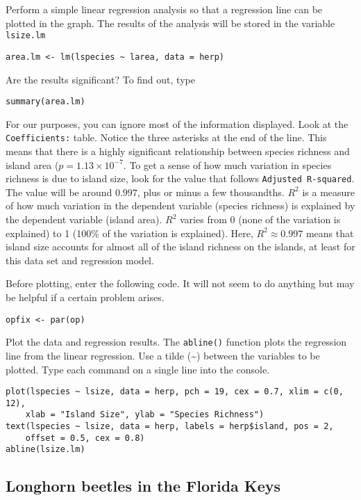 \documentclass[11pt]{article}
\begin{document}
Perform a simple linear regression analysis so that a regression line can be plotted in the graph. The results of the analysis will be stored in the variable \texttt{lsize.lm}

\begin{verbatim}
area.lm <- lm(lspecies ~ larea, data = herp)
\end{verbatim}

Are the results significant?  To find out, type

\begin{verbatim}
summary(area.lm)
\end{verbatim}

For our purposes, you can ignore most of the information displayed.  Look at the \texttt{Coefficients:} table. Notice the three asterisks at the end of the line.  This means that there is a highly significant relationship between species richness and island area ($p = 1.13 \times 10^{-7}$.  To get a sense of how much variation in species richness is due to island size, look for the value that follows \texttt{Adjusted R-squared}. The value will be around $0.997$, plus or minus a few thousandths.  $R^2$ is a measure of how much variation in the dependent variable (species richness) is explained by the dependent variable (island area). $R^2$ varies from 0 (none of the variation is explained) to 1 (100\% of the variation is explained). Here, $R^2 \approx 0.997$ means that island size accounts for almost all of the island richness on the islands, at least for this data set and regression model.

Before plotting, enter the following code. It will not seem to do anything but may be helpful if a certain problem arises.

\texttt{opfix <- par(op)}

\newpage

Plot the data and regression results.  The \texttt{abline()} function plots the regression line from the linear regression.  Use a tilde (\textasciitilde) between the variables to be plotted. Type each command on a single line into the console.

\begin{verbatim}
plot(lspecies ~ lsize, data = herp, pch = 19, cex = 0.7, xlim = c(0, 12), 
    xlab = "Island Size", ylab = "Species Richness")
text(lspecies ~ lsize, data = herp, labels = herp$island, pos = 2,
    offset = 0.5, cex = 0.8)
abline(lsize.lm)
\end{verbatim}

\subsection*{Longhorn beetles in the Florida Keys}
\end{document}
